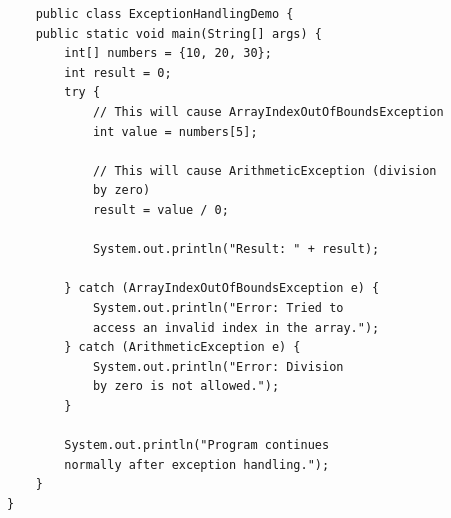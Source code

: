 \begin{verbatim}
    public class ExceptionHandlingDemo {
    public static void main(String[] args) {
        int[] numbers = {10, 20, 30};
        int result = 0;
        try {
            // This will cause ArrayIndexOutOfBoundsException
            int value = numbers[5];

            // This will cause ArithmeticException (division 
            by zero)
            result = value / 0;

            System.out.println("Result: " + result);

        } catch (ArrayIndexOutOfBoundsException e) {
            System.out.println("Error: Tried to 
            access an invalid index in the array.");
        } catch (ArithmeticException e) {
            System.out.println("Error: Division 
            by zero is not allowed.");
        }

        System.out.println("Program continues 
        normally after exception handling.");
    }
}
\end{verbatim}